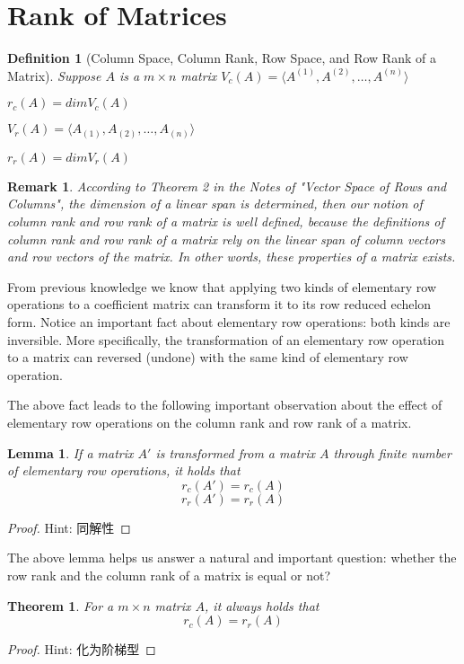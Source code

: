 \documentclass[onecolumn]{ctexart}
\newtheorem{definition}{Definition}
\newtheorem{theorem}{Theorem}
\newtheorem{lemma}{Lemma}
\newtheorem{remark}{Remark}
\begin{document}
\section{Rank of Matrices}
\begin{definition}[Column Space, Column Rank, Row Space, and Row Rank of a Matrix]
  Suppose $A$ is a $m \times n$ matrix
  $V_c(A) = \langle A^{(1)}, A^{(2)}, \ldots, A^{(n)}\rangle$

  $r_c(A) = dim V_c(A)$

  $V_r(A) = \langle A_{(1)}, A_{(2)}, \ldots, A_{(n)}\rangle $

  $r_r(A) = dim V_r(A)$
\end{definition}
\begin{remark}
  According to Theorem 2 in the Notes of "Vector Space of Rows and Columns", the 
  dimension of a linear span is determined, then our notion of column rank and 
  row rank of a matrix is well defined, because the definitions of column rank 
  and row rank of a matrix rely on the linear span of column vectors and row 
  vectors of the matrix. In other words, these properties of a 
  matrix exists.
\end{remark}

From previous knowledge we know that applying two kinds of elementary row 
operations to a coefficient matrix can transform it to its row reduced echelon 
form. Notice an important fact about elementary row operations: both kinds are 
inversible. More specifically, the transformation of an elementary row operation 
to a matrix can reversed (undone) with the same kind of elementary row operation.

The above fact leads to the following important observation about the effect of 
elementary row operations on the column rank and row rank of a matrix.
\begin{lemma}
  If a matrix $A'$ is transformed from a matrix $A$ through finite number of 
  elementary row operations, it holds that
  \[
    r_c(A') = r_c(A)
  \]
  \[
    r_r(A') = r_r(A)
  \]
\end{lemma}
\begin{proof}
  Hint: 同解性
\end{proof}

The above lemma helps us answer a natural and important question: whether the 
row rank and the column rank of a matrix is equal or not?
\begin{theorem}
  For a $m \times n$ matrix $A$, it always holds that
  \[
    r_c(A) = r_r(A)
  \]
\end{theorem}
\begin{proof}
  Hint: 化为阶梯型
\end{proof}
\end{document}
